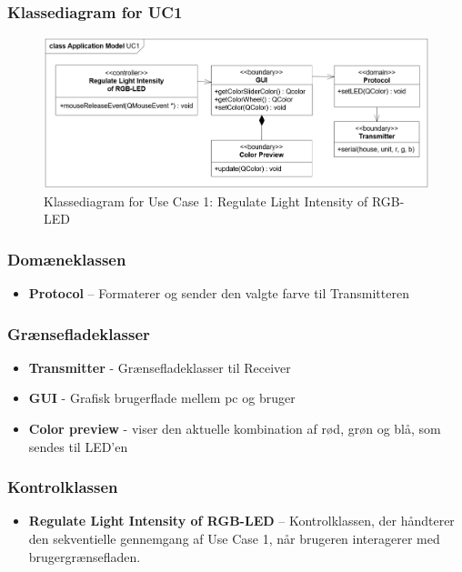 \documentclass[oneside]{memoir}
\begin{document}
\subsubsection{Klassediagram for UC1}
\begin{figure}[H]
\centering
\includegraphics[width=0.8\linewidth]{"billeder til latex/ApplikationsmodelUC1"}
\caption{Klassediagram for Use Case 1: Regulate Light Intensity of RGB-LED
}
\label{fig:ApplikationsmodelUC1}
\end{figure}
\subsubsection{Domæneklassen}
\begin{itemize}
	\item	\textbf{Protocol} – Formaterer og sender den valgte farve til Transmitteren
\end{itemize}
\subsubsection{Grænsefladeklasser}
\begin{itemize}
	\item \textbf{Transmitter} - Grænsefladeklasser til Receiver
	\item \textbf{GUI} - Grafisk brugerflade mellem pc og bruger
	\item \textbf{Color preview} - viser den aktuelle kombination af rød, grøn og blå, som sendes til LED'en
\end{itemize}
\subsubsection{Kontrolklassen}
\begin{itemize}
	\item \textbf{Regulate Light Intensity of RGB-LED} – Kontrolklassen, der håndterer den sekventielle gennemgang af Use Case 1, når brugeren interagerer med brugergrænsefladen.
\end{itemize}
\newpage
\end{document}
